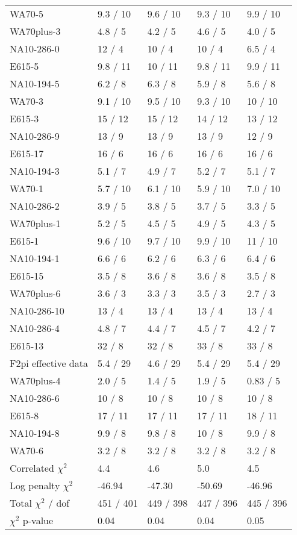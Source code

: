 \documentclass[11pt]{report}
\begin{document}
\begin{table}
\begin{center}
{\begin{tabular}{lp{2.02cm}p{2.02cm}p{2.02cm}p{2.02cm}}
  WA70-5 & 9.3 / 10& 9.6 / 10& 9.3 / 10& 9.9 / 10  \\ 
  WA70plus-3 & 4.8 / 5& 4.2 / 5& 4.6 / 5& 4.0 / 5  \\ 
  NA10-286-0 & 12 / 4& 10 / 4& 10 / 4& 6.5 / 4  \\ 
  E615-5 & 9.8 / 11& 10 / 11& 9.8 / 11& 9.9 / 11  \\ 
  NA10-194-5 & 6.2 / 8& 6.3 / 8& 5.9 / 8& 5.6 / 8  \\ 
  WA70-3 & 9.1 / 10& 9.5 / 10& 9.3 / 10& 10 / 10  \\ 
  E615-3 & 15 / 12& 15 / 12& 14 / 12& 13 / 12  \\ 
  NA10-286-9 & 13 / 9& 13 / 9& 13 / 9& 12 / 9  \\ 
  E615-17 & 16 / 6& 16 / 6& 16 / 6& 16 / 6  \\ 
  NA10-194-3 & 5.1 / 7& 4.9 / 7& 5.2 / 7& 5.1 / 7  \\ 
  WA70-1 & 5.7 / 10& 6.1 / 10& 5.9 / 10& 7.0 / 10  \\ 
  NA10-286-2 & 3.9 / 5& 3.8 / 5& 3.7 / 5& 3.3 / 5  \\ 
  WA70plus-1 & 5.2 / 5& 4.5 / 5& 4.9 / 5& 4.3 / 5  \\ 
  E615-1 & 9.6 / 10& 9.7 / 10& 9.9 / 10& 11 / 10  \\ 
  NA10-194-1 & 6.6 / 6& 6.2 / 6& 6.3 / 6& 6.4 / 6  \\ 
  E615-15 & 3.5 / 8& 3.6 / 8& 3.6 / 8& 3.5 / 8  \\ 
  WA70plus-6 & 3.6 / 3& 3.3 / 3& 3.5 / 3& 2.7 / 3  \\ 
  NA10-286-10 & 13 / 4& 13 / 4& 13 / 4& 13 / 4  \\ 
  NA10-286-4 & 4.8 / 7& 4.4 / 7& 4.5 / 7& 4.2 / 7  \\ 
  E615-13 & 32 / 8& 32 / 8& 33 / 8& 33 / 8  \\ 
  F2pi effective data & 5.4 / 29& 4.6 / 29& 5.4 / 29& 5.4 / 29  \\ 
  WA70plus-4 & 2.0 / 5& 1.4 / 5& 1.9 / 5& 0.83 / 5  \\ 
  NA10-286-6 & 10 / 8& 10 / 8& 10 / 8& 10 / 8  \\ 
  E615-8 & 17 / 11& 17 / 11& 17 / 11& 18 / 11  \\ 
  NA10-194-8 & 9.9 / 8& 9.8 / 8& 10 / 8& 9.9 / 8  \\ 
  WA70-6 & 3.2 / 8& 3.2 / 8& 3.2 / 8& 3.2 / 8  \\ 
  Correlated $\chi^2$  & 4.4& 4.6& 5.0& 4.5  \\ 
  Log penalty $\chi^2$  & -46.94& -47.30& -50.69& -46.96  \\ 
  \rowcolor{white}
      \midrule
  Total $\chi^2$ / dof  & 451 / 401& 449 / 398& 447 / 396& 445 / 396  \\ 
  \rowcolor{white}
      \midrule
  $\chi^2$ p-value  & 0.04 & 0.04 & 0.04 & 0.05   \\ 
      \bottomrule
    \end{tabular}
  }
  \end{center}
\end{table}
\end{document}
